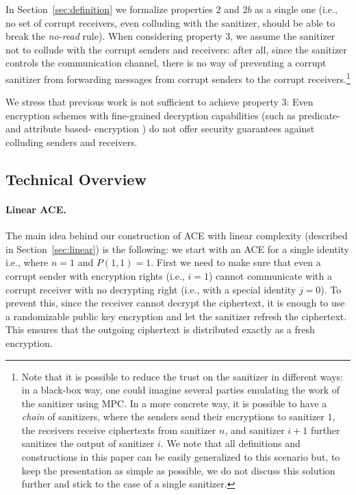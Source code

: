 \documentclass{llncs}
\begin{document}
In Section~\ref{sec:definition} we formalize properties $2$ and $2b$ as a single one (i.e., no set of corrupt receivers, even colluding with the sanitizer, should be able to break the \emph{no-read} rule). When considering property $3$, we assume the sanitizer not to collude with the corrupt senders and receivers: after all, since the sanitizer controls the communication channel, there is no way of preventing a corrupt sanitizer from forwarding messages from corrupt senders to the corrupt receivers.\footnote{Note that it is possible to reduce the trust on the sanitizer in different ways: in a black-box way, one could imagine several parties emulating the work of the sanitizer using MPC. In a more concrete way, it is possible to have a \emph{chain} of sanitizers, where the senders send their encryptions to sanitizer $1$, the receivers receive ciphertexts from sanitizer $n$, and sanitizer $i+1$ further sanitizes the output of sanitizer $i$. We note that all definitions and constructions in this paper can be easily generalized to this scenario but, to keep the presentation as simple as possible, we do not discuss this solution further and stick to the case of a single sanitizer.}

We stress that previous work is not sufficient to achieve property $3$: Even encryption schemes with fine-grained decryption capabilities (such as predicate- and attribute based- encryption \cite{DBLP:conf/ccs/GoyalPSW06,DBLP:journals/joc/KatzSW13}) do not offer security guarantees against colluding senders and receivers. 








\subsection{Technical Overview} 

\paragraph{Linear ACE.} The main idea behind our construction of ACE with linear complexity (described in Section~\ref{sec:linear}) 
is the following: we start with an ACE for a single identity i.e., where $n=1$ and $P(1,1)=1$. First we need 
to make sure that even a corrupt sender with encryption rights (i.e., $i=1$) cannot communicate with a 
corrupt receiver with no decrypting right (i.e., with a special identity $j=0$). To prevent this, since the receiver cannot 
decrypt the ciphertext, it is enough to use a randomizable public key encryption and let the sanitizer 
refresh the ciphertext. This ensures that the outgoing ciphertext is distributed exactly as a fresh 
encryption.
\end{document}
